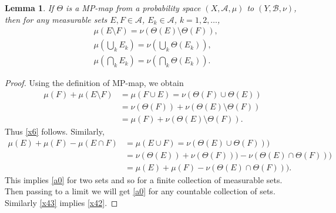 \documentclass[12pt,reqno,fleqn]{amsart}
\theoremstyle{plain} %
\newtheorem{lemma}{Lemma}[section]
\theoremstyle{remark}
\def\ZB{\ensuremath{\mathscr B}}
\def\ZA{\ensuremath{\mathscr A}}
\theoremstyle{plain}
\numberwithin{equation}{section}
\newcommand {\e }[1]{\eqref{#1}}
\begin{document}
\begin{lemma}\label{L1}
	If  $\Theta$ is a MP-map  from a probability space $(X,\ZA,\mu)$ to $(Y,\ZB,\nu)$, then for any measurable sets $E,F\in \ZA$, $E_k\in \ZA$, $k=1,2,\ldots$,
	\begin{align}
		&\mu(E\setminus F)=\nu(\Theta(E)\setminus \Theta(F)),\label{x6}\\
		&\mu\left(\bigcup_k E_k\right)=\nu\left(\bigcup_k \Theta(E_k)\right),\label{x42}\\
		&\mu\left(\bigcap_k E_k\right)=\nu\left(\bigcap_k \Theta(E_k)\right).\label{a0}
	\end{align}
\end{lemma}
\begin{proof}
	Using the definition of MP-map, we obtain
	\begin{align*}
		\mu(F)+\mu(E\setminus F)&=\mu(F\cup E)=\nu(\Theta(F)\cup\Theta(E))\\
		&=\nu(\Theta(F))+\nu(\Theta(E)\setminus\Theta(F))\\
		&=\mu(F)+\nu(\Theta(E)\setminus\Theta(F)).
	\end{align*}
	Thus \e{x6} follows. Similarly,
	\begin{align*}
		\mu(E)+\mu(F)-\mu(E\cap F)&=\mu(E\cup F)=\nu(\Theta(E)\cup \Theta(F)))\\
		&=\nu(\Theta(E))+ \nu(\Theta(F)))-\nu(\Theta(E)\cap \Theta(F)))\\
		&=\mu(E)+\mu(F)-\nu(\Theta(E)\cap \Theta(F))).
	\end{align*}
	This implies \e{a0} for two sets and so for a finite collection of measurable sets. Then passing to a limit we will get \e{a0} for any countable collection of sets. Similarly \e{x43} implies \e{x42}. 
\end{proof}
\end{document}
